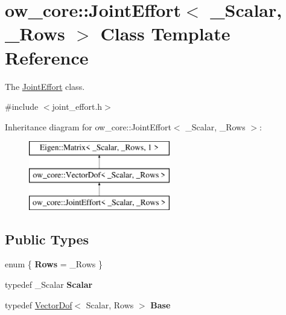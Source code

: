 \hypertarget{classow__core_1_1JointEffort}{}\section{ow\+\_\+core\+:\+:Joint\+Effort$<$ \+\_\+\+Scalar, \+\_\+\+Rows $>$ Class Template Reference}
\label{classow__core_1_1JointEffort}


The \hyperlink{classow__core_1_1JointEffort}{Joint\+Effort} class.  




{\ttfamily \#include $<$joint\+\_\+effort.\+h$>$}

Inheritance diagram for ow\+\_\+core\+:\+:Joint\+Effort$<$ \+\_\+\+Scalar, \+\_\+\+Rows $>$\+:\begin{figure}[H]
\begin{center}
\leavevmode
\includegraphics[height=3.000000cm]{d5/d72/classow__core_1_1JointEffort}
\end{center}
\end{figure}
\subsection*{Public Types}
\begin{DoxyCompactItemize}
\item 
enum \{ {\bfseries Rows} = \+\_\+\+Rows
 \}\hypertarget{classow__core_1_1JointEffort_a0f8319255d9cf53d1124a8fd22ea6714}{}\label{classow__core_1_1JointEffort_a0f8319255d9cf53d1124a8fd22ea6714}

\item 
typedef \+\_\+\+Scalar {\bfseries Scalar}\hypertarget{classow__core_1_1JointEffort_a1576c88bb00bbb19d625a30d5ed08b52}{}\label{classow__core_1_1JointEffort_a1576c88bb00bbb19d625a30d5ed08b52}

\item 
typedef \hyperlink{classow__core_1_1VectorDof}{Vector\+Dof}$<$ Scalar, Rows $>$ {\bfseries Base}\hypertarget{classow__core_1_1JointEffort_a90396788f55c3c2bb37536d70153a374}{}\label{classow__core_1_1JointEffort_a90396788f55c3c2bb37536d70153a374}

\end{DoxyCompactItemize}
